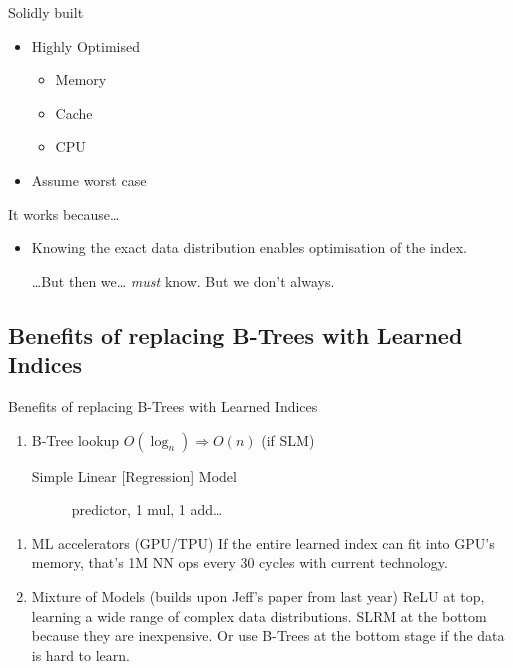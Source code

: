 \documentclass[presentation]{beamer}
\begin{document}
\begin{frame}[label={sec:orgd4971c7}]{Solidly built}
\begin{itemize}
\item Highly Optimised
\begin{itemize}
\item Memory
\item Cache
\item CPU
\end{itemize}
\item Assume worst case
\end{itemize}
\end{frame}

\begin{frame}[label={sec:orga2f1ead}]{It works because\ldots{}}
\begin{itemize}
\item \alert{Knowing} the exact data distribution \alert{enables optimisation} of the index.

\ldots{}But then we\ldots{} \emph{must} know. But we don't always.
\end{itemize}
\end{frame}

\subsection{Benefits of replacing B-Trees with Learned Indices}
\label{sec:orge9e4dec}
\begin{frame}[label={sec:org5a380cf}]{Benefits of replacing B-Trees with Learned Indices}
\begin{enumerate}
\item B-Tree lookup \(O(\log_n) \Longrightarrow O(n)\) (if SLM)
\begin{description}
\item[{Simple Linear [Regression] Model}] predictor,  1 mul, 1 add\ldots{}
\end{description}
\end{enumerate}

\begin{enumerate}
\item ML accelerators (GPU/TPU)
If the entire learned index can fit into GPU's memory, that's 1M NN ops every 30 cycles with current technology.
\item Mixture of Models (builds upon Jeff's paper from last year)
ReLU at top, learning a wide range of complex data distributions.
SLRM at the bottom because they are inexpensive.
Or use B-Trees at the bottom stage if the data is hard to learn.
\end{enumerate}
\end{frame}
\end{document}
